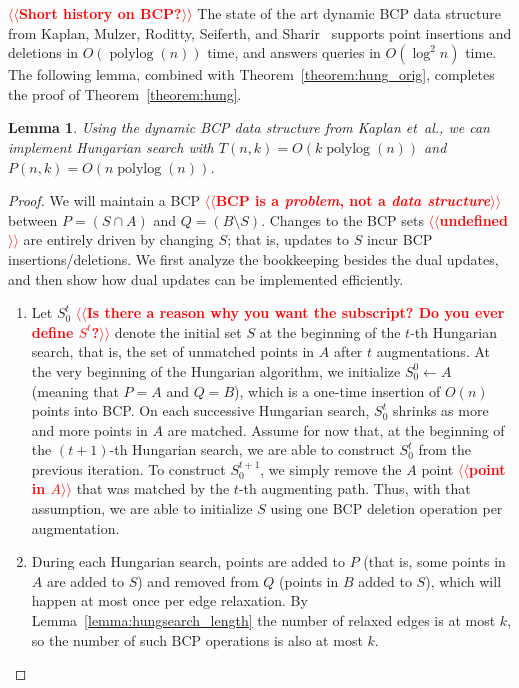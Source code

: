 \documentclass[11pt]{article}
\makeatletter
\def\etal{\textsl{et~al.}}
\def\polylog{\mathop{\mathrm{polylog}}}
\theoremstyle{plain}
\newtheorem{lemma}{Lemma}
\def\n@te#1{\textsf{\boldmath \textbf{$\langle\!\langle$#1$\rangle\!\rangle$}}\leavevmode}
\def\note#1{\textcolor{red}{\n@te{#1}}}
\makeatother
\begin{document}
\begin{figure*}
\note{Short history on BCP?}
The state of the art dynamic BCP data structure from Kaplan, Mulzer,
Roditty, Seiferth, and Sharir~\cite{KMRSS17} supports point insertions and deletions in
$O(\polylog(n))$ time, and answers queries in $O(\log^2 n)$ time.
The following lemma, combined with Theorem~\ref{theorem:hung_orig}, completes
the proof of Theorem~\ref{theorem:hung}.

\begin{lemma}
\label{lemma:hs_time}
	Using the dynamic BCP data structure from Kaplan \etal, we can implement Hungarian search with
	$T(n, k) = O(k\polylog(n))$ and $P(n, k) = O(n\polylog(n))$.
\end{lemma}
\begin{proof}
	We will maintain a BCP \note{BCP is a \emph{problem}, not a \emph{data structure}} between $P = (S \cap A)$ and
	$Q = (B \setminus S)$.
	Changes to the BCP sets \note{undefined} are entirely driven by changing $S$; that is, updates to $S$ incur BCP insertions/deletions.
	We first analyze the bookkeeping besides the dual updates, and then
	show how dual updates can be implemented efficiently.

	\begin{enumerate}
	\item Let $S^t_0$ \note{Is there a reason why you want the subscript?  Do you ever define $S^t$?} denote the initial set $S$ at the beginning of the
		$t$-th Hungarian search, that is, the set of unmatched points in $A$
		after $t$ augmentations.
		At the very beginning of the Hungarian algorithm, we initialize
		$S^0_0 \gets A$ (meaning that $P = A$ and $Q = B$), which is a
		one-time insertion of $O(n)$ points into BCP.
		On each successive Hungarian search, $S^t_0$ shrinks as more
		and more points in $A$ are matched.
		Assume for now that, at the beginning of the $(t+1)$-th
		Hungarian search, we are able to construct $S^t_0$ from the
		previous iteration.
		To construct $S^{t+1}_0$, we simply remove the $A$ point \note{point in $A$} that
		was matched by the $t$-th augmenting path.
		Thus, with that assumption, we are able to initialize $S$ using
		one BCP deletion operation per augmentation.

	\item During each Hungarian search, points are added to $P$ (that is, some points in $A$ are
		added to $S$) and removed from $Q$ (points in $B$ added to $S$), which will happen at most once per edge relaxation.
		By Lemma~\ref{lemma:hungsearch_length} the number of relaxed
		edges is at most $k$, so the number of such BCP operations is
		also at most $k$.


\end{enumerate}
\end{proof}
\end{figure*}
\end{document}
